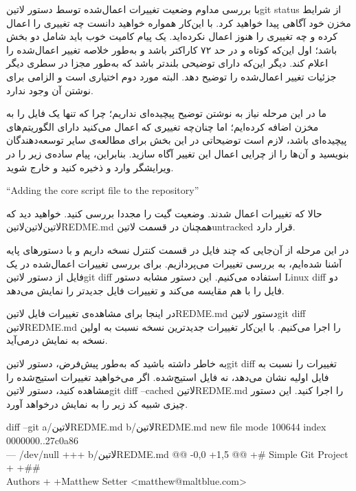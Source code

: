 با بررسی مداوم وضعیت تغییرات اعمال‌شده توسط دستور ‌لاتین{git status} از شرایط مخزن خود آگاهی پیدا خواهید کرد. با این‌کار همواره خواهید دانست چه تغییری را اعمال کرده و چه تغییری را هنوز اعمال نکرده‌اید. یک پیام کامیت خوب باید شامل دو بخش باشد؛ اول این‌که کوتاه و در حد ۷۲ کاراکتر باشد و به‌طور خلاصه تغییر اعمال‌شده را اعلام کند. دیگر این‌که دارای توضیحی بلندتر باشد که به‌طور مجزا در سطری دیگر جزئیات تغییر اعمال‌شده را توضیح دهد. البته مورد دوم اختیاری است و الزامی برای نوشتن آن وجود ندارد.

ما در این مرحله نیاز به نوشتن توضیح پیچیده‌ای نداریم؛ چرا که تنها یک فایل را به مخزن اضافه کرده‌ایم؛ اما چنان‌چه تغییری که اعمال می‌کنید دارای الگوریتم‌های پیچیده‌ای باشد، لازم است توضیحاتی در این بخش برای مطالعه‌ی سایر توسعه‌دهندگان بنویسید و آن‌ها را از چرایی اعمال این تغییر آگاه سازید. بنابراین، پیام ساده‌ی زیر را در ویرایشگر وارد و ذخیره کنید و خارج شوید.

\begin{latin}
	\singlespacing
	\noindent
	“Adding the core script file to the repository”
\end{latin}

\noindent
حالا که تغییرات اعمال شدند. وضعیت گیت را مجددا بررسی کنید. خواهید دید که ‌لاتین{‌لاتین{‌لاتین{REDME.md}}} همچنان در قسمت ‌لاتین{untracked} قرار دارد.

در این مرحله از آن‌جایی که چند فایل در قسمت کنترل نسخه داریم و با دستورهای پایه آشنا شده‌ایم، به بررسی تغییرات می‌پردازیم. برای بررسی تغییرات اعمال‌شده در یک فایل از دستور ‌لاتین{git diff} استفاده می‌کنیم. این دستور مشابه دستور Linux diff دو فایل را با هم مقایسه می‌کند و تغییرات فایل جدیدتر را نمایش می‌دهد.

در اینجا برای مشاهده‌ی تغییرات فایل ‌لاتین{REDME.md} دستور ‌لاتین{git diff ‌لاتین{REDME.md}} را اجرا می‌کنیم. با این‌کار تغییرات جدیدترین نسخه نسبت به اولین نسخه به نمایش درمی‌آید.

به خاطر داشته باشید که به‌طور پیش‌فرض، دستور ‌لاتین{git diff} تغییرات را نسبت به فایل اولیه نشان می‌دهد، نه فایل استیج‌شده. اگر می‌خواهید تغییرات استیج‌شده را مشاهده کنید، دستور ‌لاتین{git diff --cached ‌لاتین{REDME.md}} را اجرا کنید. این دستور چیزی شبیه کد زیر را به نمایش درخواهد آورد.
\begin{latin}
	\singlespacing
	\noindent
	diff --git a/‌لاتین{REDME.md} b/‌لاتین{REDME.md} new file mode 100644 index 0000000..27c0a86\\ --- /dev/null +++ b/‌لاتین{REDME.md} @@ -0,0 +1,5 @@ +\# Simple Git Project + +\#\#\\ Authors + +Matthew Setter <matthew@maltblue.com>
\end{latin}

